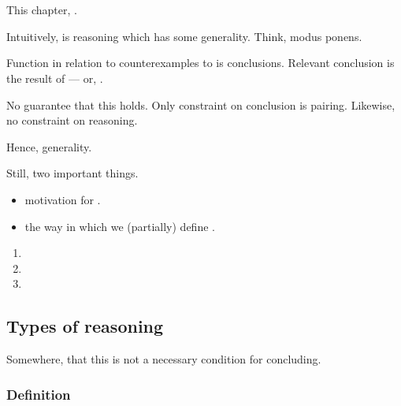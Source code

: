 \chapter{}
\label{cha:typical}

\begin{note}
  This chapter, \tR{}.

  Intuitively, \tR{} is reasoning which has some generality.
  Think, modus ponens.
\end{note}

\begin{note}
  Function in relation to counterexamples to \issueConstraint{} is conclusions.
  Relevant conclusion is the result of \tR{} --- or, \tR[concluding]{}.
\end{note}

\begin{note}
  No guarantee that this holds.
  Only constraint on conclusion is pairing.
  Likewise, no constraint on reasoning.

  Hence, generality.
\end{note}

\begin{note}
  Still, two important things.

  \begin{itemize}
  \item
    motivation for \tR{}.
  \item
    the way in which we (partially) define \tR{}.
  \end{itemize}
\end{note}

\begin{note}
  \begin{enumerate}[label=]
  \item
  \item
  \item
  \end{enumerate}
\end{note}

\section{Types of reasoning}
\label{cha:typical:sec:tor}

{
  \color{red}
  Somewhere, that this is not a necessary condition for concluding.
}

\subsection{Definition}
\label{cha:typical:sec:tor:def}

